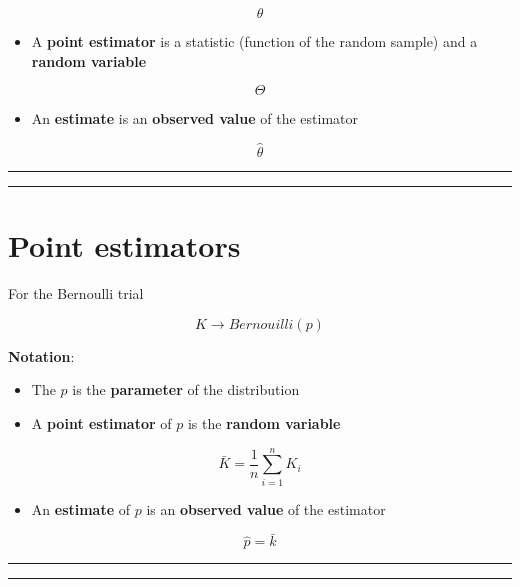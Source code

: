\documentclass[
]{book}
\providecommand{\tightlist}{%
  \setlength{\itemsep}{0pt}\setlength{\parskip}{0pt}}
\begin{document}
\[\theta\]

\begin{itemize}
\tightlist
\item
  A \textbf{point estimator} is a statistic (function of the random sample) and a \textbf{random variable}
\end{itemize}

\[\Theta\]

\begin{itemize}
\tightlist
\item
  An \textbf{estimate} is an \textbf{observed value} of the estimator
\end{itemize}

\[\hat{\theta}\]

\begin{center}\rule{0.5\linewidth}{0.5pt}\end{center}

\begin{center}\rule{0.5\linewidth}{0.5pt}\end{center}

\hypertarget{point-estimators-2}{%
\section{Point estimators}\label{point-estimators-2}}

For the Bernoulli trial

\[K \rightarrow Bernouilli(p)\]

\textbf{Notation}:

\begin{itemize}
\item
  The \(p\) is the \textbf{parameter} of the distribution
\item
  A \textbf{point estimator} of \(p\) is the \textbf{random variable}
\end{itemize}

\[\bar{K}= \frac{1}{n}\sum_{i=1}^n K_i\]

\begin{itemize}
\tightlist
\item
  An \textbf{estimate} of \(p\) is an \textbf{observed value} of the estimator
\end{itemize}

\[\hat{p}=\bar{k}\]

\begin{center}\rule{0.5\linewidth}{0.5pt}\end{center}

\begin{center}\rule{0.5\linewidth}{0.5pt}\end{center}
\end{document}
